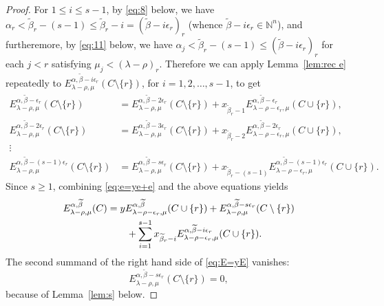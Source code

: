 \documentclass[12pt]{amsart}
\numberwithin{equation}{section}
\theoremstyle{definition}
\newcommand\wb{\widetilde{\beta}}
\newcommand\NN{\mathbb{N}}
\begin{document}
\begin{proof}
For $1\le i\le s-1$, by \eqref{eq:8} below, we have $\alpha_r < \wb_r-(s-1) \le
\wb_r-i =(\wb-i\epsilon_r)_r$
(whence $\wb-i\epsilon_r \in \NN^n$),
and furtheremore, by \eqref{eq:11} below, we
have
$\alpha_j<\wb_r-(s-1)\le (\wb-i\epsilon_r)_r$ for each $j<r$
satisfying
$\mu_j<(\lambda-\rho)_r$. Therefore we can apply Lemma~\ref{lem:rec e}
repeatedly to $E^{\alpha,\wb-i\epsilon_r}_{\lambda-\rho,\mu}(C\setminus\{r\})$,
for $i=1,2,\dots,s-1$, to get
  \begin{align*}
   E_{\lambda-\rho,\mu}^{\alpha,\wb-\epsilon_r}(C\setminus\{r\})
   &= E_{\lambda-\rho,\mu}^{\alpha,\wb-2\epsilon_r}(C\setminus\{r\})
       +x_{\wb_r-1} E_{\lambda-\rho-\epsilon_r,\mu}^{\alpha,\wb-\epsilon_r}(C\cup\{r\}),\\
   E_{\lambda-\rho,\mu}^{\alpha,\wb-2\epsilon_r}(C\setminus\{r\})
   &= E_{\lambda-\rho,\mu}^{\alpha,\wb-3\epsilon_r}(C\setminus\{r\})
     +x_{\wb_r-2} E_{\lambda-\rho-\epsilon_r,\mu}^{\alpha,\wb-2\epsilon_r}(C\cup\{r\}),\\
    \vdots\\
   E_{\lambda-\rho,\mu}^{\alpha,\wb-(s-1)\epsilon_r}(C\setminus\{r\})
   &= E_{\lambda-\rho,\mu}^{\alpha,\wb-s\epsilon_r}(C\setminus\{r\})
     +x_{\wb_r-(s-1)} E_{\lambda-\rho-\epsilon_r,\mu}^{\alpha,\wb-(s-1)\epsilon_r}(C\cup\{r\}).
  \end{align*}
  Since $s\ge1$, combining \eqref{eq:e=ye+e} and the above equations yields
\begin{align}\label{eq:E=yE}
E^{\alpha,\wb}_{\lambda-\rho,\mu}(C) 
   &= y E^{\alpha,\wb}_{\lambda-\rho-\epsilon_r,\mu}(C\cup\{r\}) 
  +E_{\lambda-\rho,\mu}^{\alpha,\wb-s\epsilon_r}(C\setminus\{r\}) \\
  \notag &\qquad + \sum_{i=1}^{s-1}
       x_{\wb_r-i} E_{\lambda-\rho-\epsilon_r,\mu}^{\alpha,\wb-i\epsilon_r}(C\cup\{r\}).
  \end{align}
  The second summand of the right hand side of \eqref{eq:E=yE} vanishes:
  \begin{equation}\label{eq:ECr=0}
E_{\lambda-\rho,\mu}^{\alpha,\wb-s\epsilon_r}(C\setminus\{r\}) = 0,
  \end{equation}
  because of Lemma~\ref{lem:s} below.


\end{proof}
\end{document}
